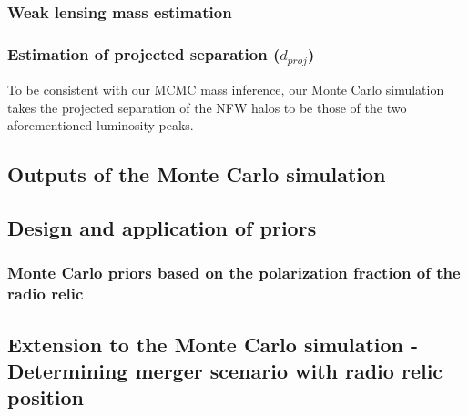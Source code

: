 \subsubsection{Weak lensing mass estimation} 



\subsubsection{Estimation of projected separation ($d_{proj}$) } 
To be consistent with our MCMC mass inference, our Monte Carlo simulation takes 
the projected separation of the NFW halos to be those of the two aforementioned 
luminosity peaks.

\subsection{Outputs of the Monte Carlo simulation}
\label{sec: outputs}


\subsection{Design and application of priors} 
\label{sec:priors}


\subsubsection{Monte Carlo priors based on the polarization fraction of the radio relic}


\subsection{Extension to the Monte Carlo simulation - Determining merger scenario with radio relic position}
\label{sec: positionprior}



